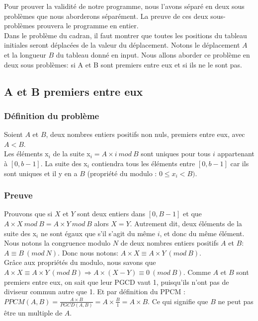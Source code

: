 Pour prouver la validité de notre programme, nous l'avons séparé en deux sous problèmes que nous aborderons séparément. La preuve de ces deux sous-problèmes prouvera le programme en entier.\\
Dans le problème du cadran, il faut montrer que toutes les positions du tableau initiales seront déplacées de la valeur du déplacement. Notons le déplacement $A$ et la longueur $B$ du tableau donné en input. Nous allons aborder ce problème en deux sous problèmes: si A et B sont premiers entre eux et si ils ne le sont pas.\\  

\subsection{A et B premiers entre eux}
\subsubsection* {Définition du problème}
Soient $A$ et $B$, deux nombres entiers positifs non nuls, premiers entre eux, avec $A < B$.\\
Les éléments x$_{i}$ de la suite x$_{i} = A \times i\ mod\ B$ sont uniques pour tous $i$ appartenant à $[0, b-1]$.
La suite des x$_{i}$ contiendra tous les éléments entre $[0, b-1]$ car ils sont uniques et il y en a $B$ (propriété du modulo : $0\leq x_i < B)$.

\subsubsection* {Preuve}
Prouvons que si $X$ et $Y$ sont deux entiers dans $[0, B-1]$ et que $A\times X\ mod\ B = A\times Y\ mod\ B$ alors $X = Y$. Autrement dit, deux éléments de la suite des x$_{i}$ ne sont égaux que s'il s'agit du même $i$, et donc du même élément. Nous notons la congruence modulo $N$ de deux nombres entiers positifs $A$ et $B$: $A \equiv B\ (mod\ N)$. Donc nous notons: $A\times X ≡ A\times Y\ (mod\ B)$.\\

Grâce aux propriétés du modulo, nous savons que $A\times X ≡ A\times Y\ (mod\ B) \Rightarrow A\times (X-Y) ≡ 0\ (mod\ B).$ Comme $A$ et $B$ sont premiers entre eux, on sait que leur PGCD vaut 1, puisqu'ils n'ont pas de diviseur commun autre que 1. Et par définition du PPCM : $PPCM(A,B) = \frac{A\times B}{PGCD(A,B)} = A\times \frac{B}{1} = A\times B$. Ce qui signifie que $B$ ne peut pas être un multiple de $A$.\\

